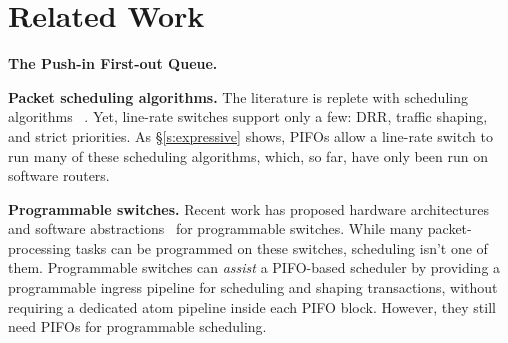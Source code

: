 \section{Related Work}
\label{s:related}

\medskip
\noindent
\textbf{The Push-in First-out Queue.}

\medskip
\noindent
\textbf{Packet scheduling algorithms.}
The literature is replete with scheduling algorithms~\cite{pFabric, hpfq,
stopngo, stfq, lstf, srpt, drr, rcsd} . Yet, line-rate switches support only a
few: DRR, traffic shaping, and strict priorities. As \S\ref{s:expressive}
shows, PIFOs allow a line-rate switch to run many of these scheduling
algorithms, which, so far, have only been run on software routers.

\medskip
\noindent
\textbf{Programmable switches.} Recent work has proposed hardware architectures~\cite{tofino, flexpipe,
xpliant, rmt} and software abstractions~\cite{p4, domino_sigcomm} for
programmable switches.  While many packet-processing tasks can be programmed on
these switches, scheduling isn't one of them. Programmable switches can {\em
assist} a PIFO-based scheduler by providing a programmable ingress pipeline for
scheduling and shaping transactions, without requiring a dedicated atom
pipeline inside each PIFO block.  However, they still need PIFOs for
programmable scheduling.

